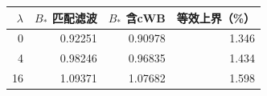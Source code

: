 \begin{tabular}{rrrr}
\toprule
$\lambda$ & $B_*$ 匹配滤波 & $B_*$ 含cWB & 等效上界（\%） \\
\midrule
0 & 0.92251 & 0.90978 & 1.346 \\
4 & 0.98246 & 0.96835 & 1.434 \\
16 & 1.09371 & 1.07682 & 1.598 \\
\bottomrule
\end{tabular}
